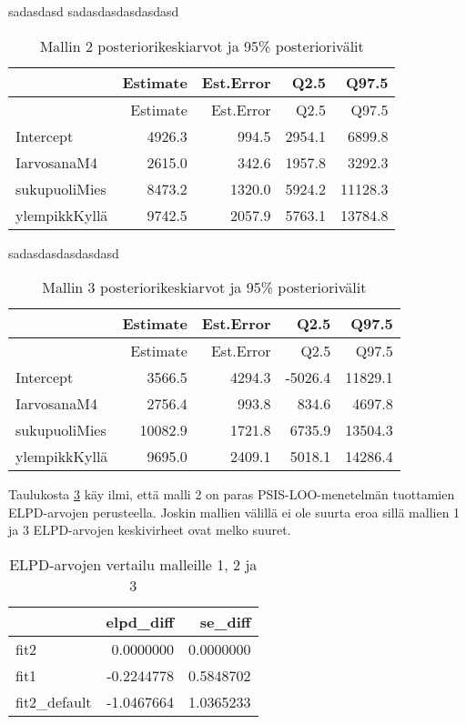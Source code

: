 \documentclass[
]{article}
\begin{document}
sadasdasd
sadasdasdasdasdasd

\begin{longtable}[]{@{}lrrrr@{}}
\caption{\label{tab:Malli2}Mallin 2 posteriorikeskiarvot ja 95\% posteriorivälit}\tabularnewline
\toprule\noalign{}
& Estimate & Est.Error & Q2.5 & Q97.5 \\
\midrule\noalign{}
\endfirsthead
\toprule\noalign{}
& Estimate & Est.Error & Q2.5 & Q97.5 \\
\midrule\noalign{}
\endhead
\bottomrule\noalign{}
\endlastfoot
Intercept & 4926.3 & 994.5 & 2954.1 & 6899.8 \\
IarvosanaM4 & 2615.0 & 342.6 & 1957.8 & 3292.3 \\
sukupuoliMies & 8473.2 & 1320.0 & 5924.2 & 11128.3 \\
ylempikkKyllä & 9742.5 & 2057.9 & 5763.1 & 13784.8 \\
\end{longtable}

sadasdasdasdasdasd

\begin{longtable}[]{@{}lrrrr@{}}
\caption{\label{tab:Malli3}Mallin 3 posteriorikeskiarvot ja 95\% posteriorivälit}\tabularnewline
\toprule\noalign{}
& Estimate & Est.Error & Q2.5 & Q97.5 \\
\midrule\noalign{}
\endfirsthead
\toprule\noalign{}
& Estimate & Est.Error & Q2.5 & Q97.5 \\
\midrule\noalign{}
\endhead
\bottomrule\noalign{}
\endlastfoot
Intercept & 3566.5 & 4294.3 & -5026.4 & 11829.1 \\
IarvosanaM4 & 2756.4 & 993.8 & 834.6 & 4697.8 \\
sukupuoliMies & 10082.9 & 1721.8 & 6735.9 & 13504.3 \\
ylempikkKyllä & 9695.0 & 2409.1 & 5018.1 & 14286.4 \\
\end{longtable}

Taulukosta \ref{tab:LOO} käy ilmi, että malli 2 on paras PSIS-LOO-menetelmän tuottamien ELPD-arvojen perusteella. Joskin mallien välillä ei ole suurta eroa sillä mallien 1 ja 3 ELPD-arvojen keskivirheet ovat melko suuret.

\begin{table}

\caption{\label{tab:LOO}ELPD-arvojen vertailu malleille 1, 2 ja 3}
\centering
\begin{tabular}[t]{l|r|r}
\hline
  & elpd\_diff & se\_diff\\
\hline
fit2 & 0.0000000 & 0.0000000\\
\hline
fit1 & -0.2244778 & 0.5848702\\
\hline
fit2\_default & -1.0467664 & 1.0365233\\
\hline
\end{tabular}
\end{table}
\end{document}

